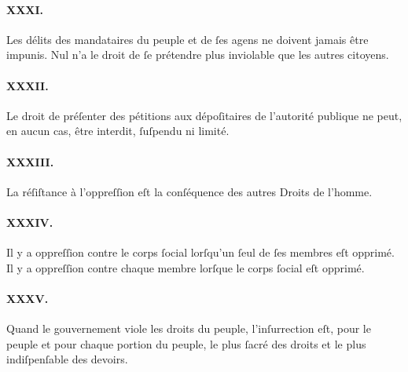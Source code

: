 \documentclass[10pt]{lecturenotes}
\begin{document}
\paragraph*{XXXI.}Les délits des mandataires du peuple et de ſes agens ne doivent jamais être impunis. Nul n'a le droit de ſe prétendre plus inviolable que les autres citoyens.
\paragraph*{XXXII.}Le droit de préſenter des pétitions aux dépoſitaires de l'autorité publique ne peut, en aucun cas, être interdit, ſuſpendu ni limité.
\paragraph*{XXXIII.}La réſiſtance à l'oppreſſion eſt la conſéquence des autres Droits de l'homme.
\paragraph*{XXXIV.}Il y a oppreſſion contre le corps ſocial lorſqu'un ſeul de ſes membres eſt opprimé. Il y a oppreſſion contre chaque membre lorſque le corps ſocial eſt opprimé.
\paragraph*{XXXV.}Quand le gouvernement viole les droits du peuple, l'inſurrection eſt, pour le peuple et pour chaque portion du peuple, le plus ſacré des droits et le plus indiſpenſable des devoirs.

\pagebreak
\end{document}
